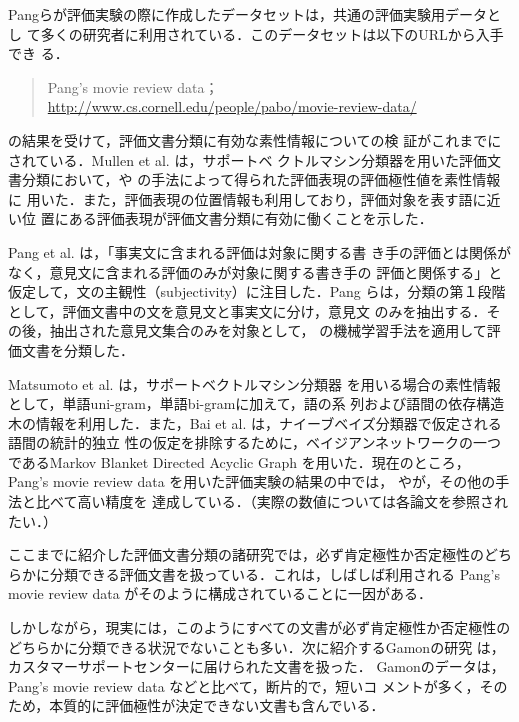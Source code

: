 Pangらが評価実験の際に作成したデータセットは，共通の評価実験用データとし
て多くの研究者に利用されている．このデータセットは以下のURLから入手でき
る．

\vspace{1em}
\begin{quote}
Pang's movie review data； \\
\url{http://www.cs.cornell.edu/people/pabo/movie-review-data/} 
\end{quote}

\vspace{1em}

\cite{pang2002a}の結果を受けて，評価文書分類に有効な素性情報についての検
証がこれまでにされている．Mullen et al. \cite{mullen2004a}は，サポートベ
クトルマシン分類器を用いた評価文書分類において，\cite{turney2002a}や
\cite{kamps2004a} の手法によって得られた評価表現の評価極性値を素性情報に
用いた．また，評価表現の位置情報も利用しており，評価対象を表す語に近い位
置にある評価表現が評価文書分類に有効に働くことを示した．

Pang et al. \cite{pang2004a} は，「事実文に含まれる評価は対象に関する書
き手の評価とは関係がなく，意見文に含まれる評価のみが対象に関する書き手の
評価と関係する」と仮定して，文の主観性（subjectivity）に注目した．Pang 
らは，分類の第１段階として，評価文書中の文を意見文と事実文に分け，意見文
のみを抽出する．その後，抽出された意見文集合のみを対象として，
\cite{pang2002a} の機械学習手法を適用して評価文書を分類した．

Matsumoto et al. \cite{matsumoto2005a} は，サポートベクトルマシン分類器
を用いる場合の素性情報として，単語uni-gram，単語bi-gramに加えて，語の系
列および語間の依存構造木の情報を利用した．また，Bai et
al. \cite{bai2004a} は，ナイーブベイズ分類器で仮定される語間の統計的独立
性の仮定を排除するために，ベイジアンネットワークの一つであるMarkov
Blanket Directed Acyclic Graph \cite{pearl1988a}を用いた．現在のところ，
Pang's movie review data を用いた評価実験の結果の中では，
\cite{matsumoto2005a}や\cite{bai2004a}が，その他の手法と比べて高い精度を
達成している．（実際の数値については各論文を参照されたい．）

\vspace{1em}
ここまでに紹介した評価文書分類の諸研究では，必ず肯定極性か否定極性のどち
らかに分類できる評価文書を扱っている．これは，しばしば利用される Pang's
movie review data がそのように構成されていることに一因がある．

しかしながら，現実には，このようにすべての文書が必ず肯定極性か否定極性の
どちらかに分類できる状況でないことも多い．次に紹介するGamonの研究
\cite{gamon2004a}は，カスタマーサポートセンターに届けられた文書を扱った．
Gamonのデータは，Pang's movie review data などと比べて，断片的で，短いコ
メントが多く，そのため，本質的に評価極性が決定できない文書も含んでいる．

